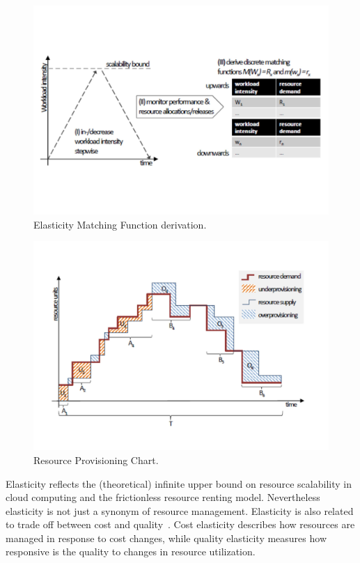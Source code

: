 \begin{figure}
	\centering
	\includegraphics[width=\columnwidth]{Images/elasticity_matching_function.pdf}
	\caption[Elasticity Matching Function derivation.]{Elasticity Matching Function derivation.}
	\label{fig:elasticity_matching_function}
\end{figure}
\begin{figure}
	\centering
	\includegraphics[width=\columnwidth]{Images/elasticity_resource_provisioning_chart.pdf}
	\caption[Resource Provisioning Chart.]{Resource Provisioning Chart.}
	\label{fig:elasticity_resource_provisioning_chart}
\end{figure}

Elasticity reflects the (theoretical) infinite upper bound on resource scalability in cloud computing and the frictionless resource renting model. Nevertheless elasticity is not just a synonym of resource management. Elasticity is also related to trade off between cost and quality~\cite{Dustdar2011}. Cost elasticity describes how resources are managed in response to cost changes, while quality elasticity measures how responsive is the quality to changes in resource utilization.

